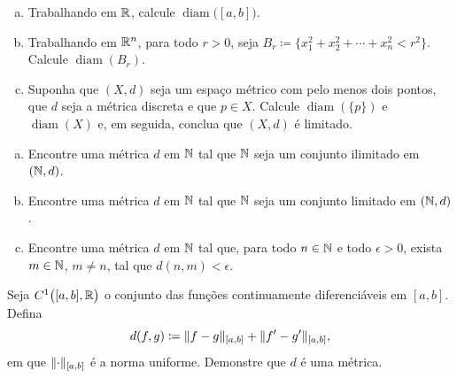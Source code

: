 \begin{exercise}
\pagebreak[2]
\leavevmode
\begin{enumerate}[a)]
\item
Trabalhando em ${\mathbb{R}}$, calcule $\operatorname{diam}\bigl([a,b]\bigr)$.
\item
Trabalhando em ${\mathbb{R}}^n$, para todo $r > 0$, seja
$B_r \coloneqq \{ x_1^2+x_2^2+\cdots+x_n^2 < r^2 \}$. Calcule
$\operatorname{diam}(B_r)$.
\item
Suponha que $(X,d)$ seja um espaço métrico com pelo menos dois pontos, que
$d$ seja a métrica discreta e que $p \in X$.
Calcule $\operatorname{diam}(\{ p \})$ e $\operatorname{diam}(X)$ e, em
seguida, conclua que $(X,d)$ é limitado.
\end{enumerate}
\end{exercise}

\begin{exercise}
\pagebreak[2]
\leavevmode
\begin{enumerate}[a)]
\item
Encontre uma métrica $d$ em ${\mathbb{N}}$ tal que ${\mathbb{N}}$ seja um conjunto ilimitado em
$({\mathbb{N}},d)$.
\item
Encontre uma métrica $d$ em ${\mathbb{N}}$ tal que ${\mathbb{N}}$ seja um conjunto limitado em
$({\mathbb{N}},d)$.
\item
Encontre uma métrica $d$ em ${\mathbb{N}}$ tal que, para todo $n \in {\mathbb{N}}$ e todo
$\epsilon > 0$, exista $m \in {\mathbb{N}}$, $m \neq n$, tal que $d(n,m) < \epsilon$.
\end{enumerate}
\end{exercise}

\begin{exercise} \label{exercise:C1ab}
Seja $C^1\bigl([a,b],{\mathbb{R}}\bigr)$ o conjunto das
funções continuamente diferenciáveis em $[a,b]$.
Defina
\begin{equation*}
d(f,g) \coloneqq \lVert {f-g} \rVert_{[a,b]} + \lVert {f'-g'} \rVert_{[a,b]},
\end{equation*}
em que $\lVert {\cdot} \rVert_{[a,b]}$ é a norma uniforme. Demonstre que $d$ é uma
métrica.
\end{exercise}

